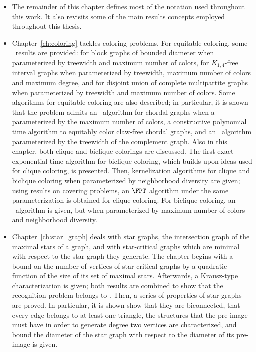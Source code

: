 \begin{itemize}
    \item The remainder of this chapter defines most of the notation used throughout this work.
    It also revisits some of the main results concepts employed throughout this thesis.
    \item Chapter~\ref{ch:coloring} tackles coloring problems.
    For equitable coloring, some \W[1]-\Hness\ results are provided: for block graphs of bounded diameter when parameterized by treewidth and maximum number of colors, for $K_{1,4}$-free interval graphs when parameterized by treewidth, maximum number of colors and maximum degree, and for disjoint union of complete multipartite graphs when parameterized by treewidth and maximum number of colors.
    Some algorithms for equitable coloring are also described; in particular, it is shown that the problem admits an \XP\ algorithm for chordal graphs when a parameterized by the maximum number of colors, a constructive polynomial time algorithm to equitably color claw-free chordal graphs, and an \FPT\ algorithm parameterized by the treewidth of the complement graph.
    Also in this chapter, both clique and biclique colorings are discussed.
    The first exact exponential time algorithm for biclique coloring, which builds upon ideas used for clique coloring, is presented.
    Then, kernelization algorithms for clique and biclique coloring when parameterized by neighborhood diversity are given; using results on covering problems, an $\FPT$ algorithm under the same parameterization is obtained for clique coloring.
    For biclique coloring, an \FPT\ algorithm is given, but when parameterized by maximum number of colors and neighborhood diversity.
    \item Chapter~\ref{ch:star_graph} deals with star graphs, the intersection graph of the maximal stars of a graph, and with star-critical graphs which are minimal with respect to the star graph they generate.
    The chapter begins with a bound on the number of vertices of star-critical graphs by a quadratic function of the size of its set of maximal stars.
    Afterwards, a Krausz-type characterization is given; both results are combined to show that the recognition problem belongs to \NP.
    Then, a series of properties of star graphs are proved.
    In particular, it is shown show that they are biconnected, that every edge belongs to at least one triangle, the structures that the pre-image must have in order to generate degree two vertices are characterized, and bound the diameter of the star graph with respect to the diameter of its pre-image is given.

\end{itemize}
